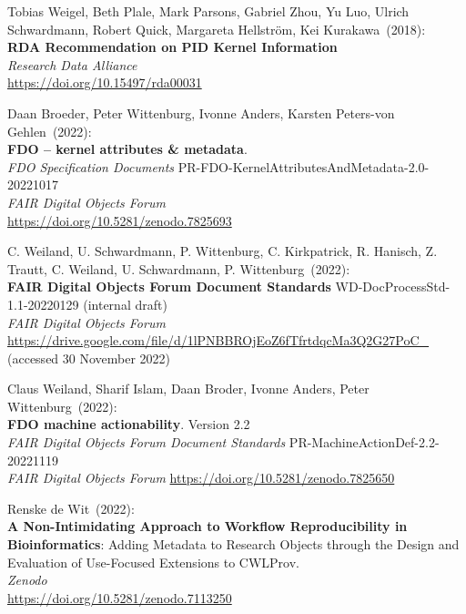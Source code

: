 \begin{thebibliography}{9}
Tobias Weigel, Beth Plale, Mark Parsons, Gabriel Zhou, Yu Luo, Ulrich
Schwardmann, Robert Quick, Margareta Hellström, Kei Kurakawa~(2018): \\
\textbf{{RDA Recommendation} on {PID Kernel Information}} \\
\emph{Research Data Alliance}\\
\url{https://doi.org/10.15497/rda00031}

Daan Broeder, Peter Wittenburg, Ivonne Anders, Karsten Peters-von
Gehlen~(2022): \\
\textbf{FDO -- kernel attributes \& metadata}.\\ 
\emph{FDO Specification Documents} PR-FDO-KernelAttributesAndMetadata-2.0-20221017 \\
\emph{FAIR Digital Objects Forum}\\
\url{https://doi.org/10.5281/zenodo.7825693}

C. Weiland, U. Schwardmann, P. Wittenburg, C. Kirkpatrick, R. Hanisch,
Z. Trautt, C. Weiland, U. Schwardmann, P. Wittenburg~(2022): \\
\textbf{{FAIR Digital Objects Forum Document Standards}} WD-DocProcessStd-1.1-20220129 (internal draft) \\
\emph{FAIR Digital Objects Forum}\\
\url{https://drive.google.com/file/d/1lPNBBROjEoZ6fTfrtdqcMa3Q2G27PoC_}
(accessed 30 November 2022)

Claus Weiland, Sharif Islam, Daan Broder, Ivonne Anders, Peter Wittenburg~(2022): \\
\textbf{{FDO} machine actionability}. Version 2.2 \\
\emph{{FAIR Digital Objects Forum Document Standards}} PR-MachineActionDef-2.2-20221119 \\
\emph{FAIR Digital Objects Forum}
\url{https://doi.org/10.5281/zenodo.7825650}

Renske de Wit~(2022): \\
\textbf{A Non-Intimidating Approach to Workflow Reproducibility in Bioinformatics}: Adding Metadata to Research Objects through the Design and Evaluation of Use-Focused Extensions to CWLProv.\\
\emph{Zenodo}\\
\url{https://doi.org/10.5281/zenodo.7113250}


\end{thebibliography}
